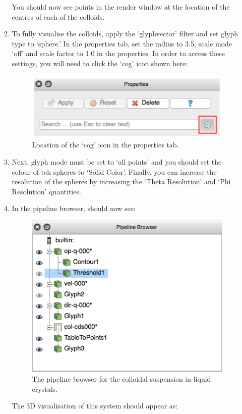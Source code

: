 \documentclass[11pt,twoside,a4paper]{article}
\begin{document}
\begin{enumerate}
\begin{enumerate}
 You should now see points in the render window at the location of the centres of each of the colloids.
\item To fully visualise the colloids, apply the `glyphvector' filter and set glyph type to 
`sphere.' In the properties tab, set the radius to 3.5, scale mode `off' and scale factor to 
1.0 in the properties. In order to access these settings, you will need to click the `cog' icon shown here:

\begin{figure}[H]
\begin{center}
\includegraphics[width=0.5\linewidth]{cog.png}
  \caption{Location of the `cog' icon in the properties tab.}
  \label{fig:cog}
  \end{center}
\end{figure}

\item Next, glyph mode must be set to `all points' and you should set the colour of teh spheres to `Solid Color'. Finally, you can increase the resolution of the spheres by increasing the `Theta Resolution' and `Phi Resolution' quantities.
\item In the pipeline browser, should now see: 

\begin{figure}[H]
\begin{center}
\includegraphics[width=0.6\linewidth]{colloidsPipeline.png}
  \caption{The pipeline browser for the colloidal suspension in liquid crystals.}
  \label{fig:collPipe}
  \end{center}
\end{figure}

The 3D visualisation of this system should appear as:


\end{enumerate}
\end{enumerate}
\end{document}
